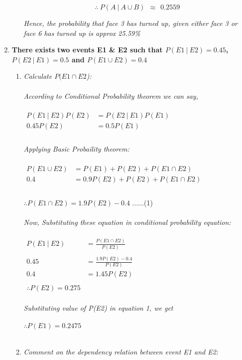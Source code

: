 \documentclass{article}
\begin{document}
\begin{enumerate}
\begin{enumerate}
        \[
          \boxed{\therefore\ P(A \ |\ A \cup B)\ \ \approx \ \ 0.2559}
        \]
        
        \textit{Hence, the probability that face 3 has turned up, given either face 3 or face 6 has turned up is approx 25.59\%}
\end{enumerate}
\newpage
\item \textbf{There exists two events E1 \& E2 such that $P(E1 \ |\ E2) = 0.45$, $P(E2 \ |\ E1) = 0.5$ and $P(E1 \cup E2) = 0.4$}
  \begin{enumerate}
    \item\textit{Calculate $P(E1 \cap E2$):}\\\\
    \textit{According to Conditional Probability theorem we can say,}\\\\
    $\begin{aligned}
      P(E1 \ |\ E2)P(E2) & = P(E2 \ |\ E1)P(E1)\\
      0.45P(E2) & = 0.5P(E1) \\
    \end{aligned}$\\\\
    \textit{Applying Basic Probaility theorem:}\\\\
    $\begin{aligned}
      P(E1 \cup E2) & = P(E1) + P(E2) + P(E1 \cap E2)\\
      0.4 & = 0.9P(E2) + P(E2) + P(E1 \cap E2)\\\\
    \end{aligned}$

    $\therefore P(E1 \cap E2) = 1.9P(E2) - 0.4$ \hspace{8cm}......(1)\\\\
    \textit{Now, Substituting these equation in conditional probability equation:}\\\\
    $\begin{aligned}
      P(E1 \ |\ E2) & = \frac{P(E1 \cap E2)}{P(E2)}\\\\
      0.45 & = \frac{1.9P(E2) - 0.4}{P(E2)}\\
      0.4 & = 1.45P(E2)\\\\
      \therefore P(E2) = 0.275
    \end{aligned}$\\\\
    \textit{Substituting value of P(E2) in equation 1, we get}\\\\
    $\therefore P(E1) = 0.2475$\\\\
    \item \textit{ Comment on the dependency relation between event E1 and E2:}
    

\end{enumerate}
\end{enumerate}
\end{document}
